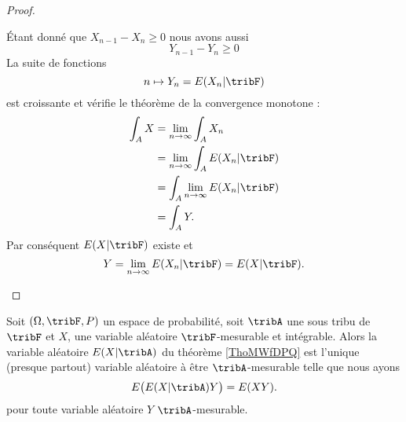 \begin{proof}
\begin{description}
            Étant donné que \( X_{n-1}-X_n\geq 0\) nous avons aussi
            \begin{equation}
                Y_{n-1}-Y_{n}\geq 0
            \end{equation}
            La suite de fonctions
            \begin{equation}
                n\mapsto Y_n=E(X_n|\tribF)
            \end{equation}
            est croissante et vérifie le théorème de la convergence monotone :
            \begin{subequations}
                \begin{align}
                    \int_A X&=\lim_{n\to \infty} \int_A X_n\\
                    &=\lim_{n\to \infty} \int_A E(X_n|\tribF)\\
                    &=\int_A\lim_{n\to \infty } E(X_n|\tribF)\\
                    &=\int_A Y.
                \end{align}
            \end{subequations}
            Par conséquent \( E(X|\tribF)\) existe et
            \begin{equation}
                Y=\lim_{n\to \infty} E(X_n|\tribF)=E(X|\tribF).
            \end{equation}
    \end{description}
\end{proof}

\begin{proposition}
    Soit \( (\Omega,\tribF,P)\) un espace de probabilité, soit \( \tribA\) une sous tribu de \( \tribF\) et \( X\), une variable aléatoire \( \tribF\)-mesurable et intégrable. Alors la variable aléatoire \( E(X|\tribA)\) du théorème \ref{ThoMWfDPQ} est l'unique (presque partout) variable aléatoire à être \( \tribA\)-mesurable telle que nous ayons
    \begin{equation}
        E\big( E(X|\tribA)Y \big)=E(XY).
    \end{equation}  
    pour toute variable aléatoire \( Y\) \( \tribA\)-mesurable.
\end{proposition}

